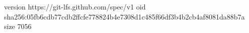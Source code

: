 version https://git-lfs.github.com/spec/v1
oid sha256:05fb6cdb77cdb2ffcfe778824b4e7308d1c485f66df3b4b2cb4af8081da88b7a
size 7056
